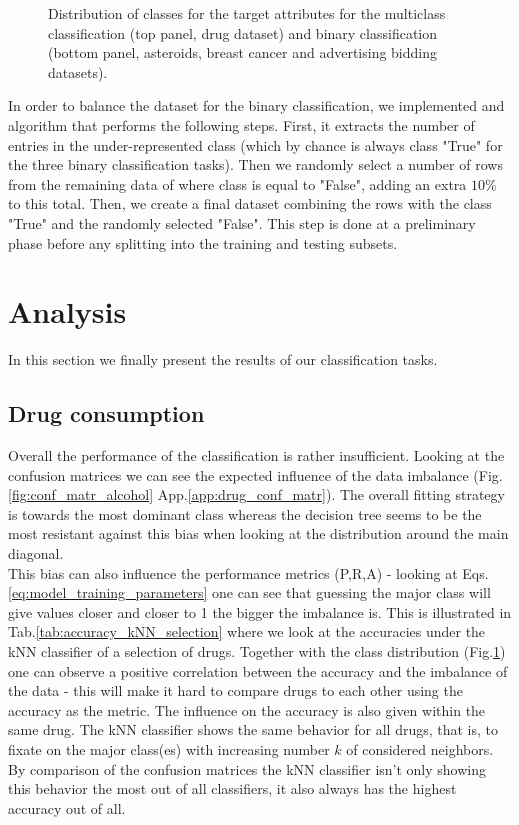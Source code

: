 \documentclass{article}
\begin{document}
\begin{figure}[h!]
\begin{minipage}[b]{0.32\textwidth}
    \end{minipage}
	\caption{Distribution of classes for the target attributes for the multiclass classification (top panel, drug dataset) and binary classification (bottom panel, asteroids, breast cancer and advertising bidding datasets).}
	\label{fig:imbalance}
\end{figure}

In order to balance the dataset for the binary classification, we implemented and algorithm that performs the following steps.
First, it extracts the number of entries in the under-represented class (which by chance is always class "True" for the three binary classification tasks). Then we randomly select a number of rows from the remaining data of where class is equal to "False", adding an extra $10\%$ to this total. Then, we create a final dataset combining the rows with the class "True" and the randomly selected "False".
This step is done at a preliminary phase before any splitting into the training and testing subsets.


\section{Analysis}
In this section we finally present the results of our classification tasks.

\subsection{Drug consumption}

Overall the performance of the classification is rather insufficient. Looking at the confusion matrices we can see the expected influence of the data imbalance (Fig.\ref{fig:conf_matr_alcohol} App.\ref{app:drug_conf_matr}). The overall fitting strategy is towards the most dominant class whereas the decision tree seems to be the most resistant against this bias when looking at the distribution around the main diagonal. \\

This bias can also influence the performance metrics (P,R,A) - looking at Eqs.\ref{eq:model_training_parameters} one can see that guessing the major class will give values closer and closer to 1 the bigger the imbalance is. This is illustrated in Tab.\ref{tab:accuracy_kNN_selection} where we look at the accuracies under the kNN classifier of a selection of drugs. Together with the class distribution (Fig.\ref{fig:imbalance}) one can observe a positive correlation between the accuracy and the imbalance of the data - this will make it hard to compare drugs to each other using the accuracy as the metric. The influence on the accuracy is also given within the same drug. The kNN classifier shows the same behavior for all drugs, that is, to fixate on the major class(es) with increasing number $k$ of considered neighbors. By comparison of the confusion matrices the kNN classifier isn't only showing this behavior the most out of all classifiers, it also always has the highest accuracy out of all.\\
\end{document}
